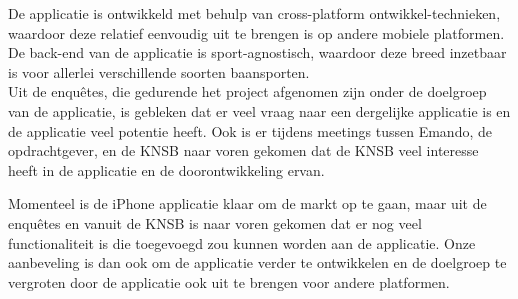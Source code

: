 De applicatie is ontwikkeld met behulp van cross-platform ontwikkel-technieken, waardoor deze relatief eenvoudig uit te brengen is op andere mobiele platformen. De back-end van de applicatie is sport-agnostisch, waardoor deze breed inzetbaar is voor allerlei verschillende soorten baansporten. \\

\noindent 
Uit de enquêtes, die gedurende het project afgenomen zijn onder de doelgroep van de applicatie, is gebleken dat er veel vraag naar een dergelijke applicatie is en de applicatie veel potentie heeft. Ook is er tijdens meetings tussen Emando, de opdrachtgever, en de \ac{KNSB} naar voren gekomen dat de \ac{KNSB} veel interesse heeft in de applicatie en de doorontwikkeling ervan.

Momenteel is de iPhone applicatie klaar om de markt op te gaan, maar uit de enquêtes en vanuit de \ac{KNSB} is naar voren gekomen dat er nog veel functionaliteit is die toegevoegd zou kunnen worden aan de applicatie. Onze aanbeveling is dan ook om de applicatie verder te ontwikkelen en de doelgroep te vergroten door de applicatie ook uit te brengen voor andere platformen.

